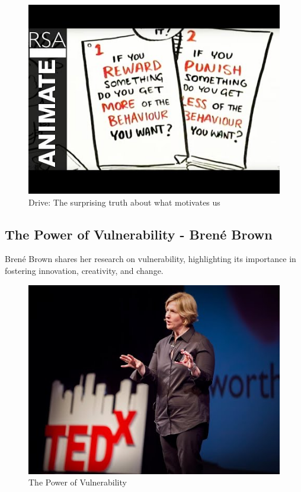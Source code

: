 \documentclass[
  letterpaper,
  DIV=11,
  numbers=noendperiod]{scrreprt}
\begin{document}
\begin{figure}[H]

{\centering \includegraphics{index_files/mediabag/012.jpg}

}

\caption{Drive: The surprising truth about what motivates us}

\end{figure}%

\subsection{The Power of Vulnerability - Brené
Brown}\label{the-power-of-vulnerability---brenuxe9-brown}

Brené Brown shares her research on vulnerability, highlighting its
importance in fostering innovation, creativity, and change.

\begin{figure}[H]

{\centering \includegraphics{index_files/mediabag/0123.jpg}

}

\caption{The Power of Vulnerability}

\end{figure}%
\end{document}
